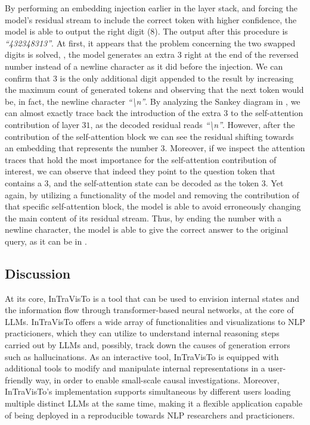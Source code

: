 By performing an embedding injection earlier in the layer stack, and forcing the model's residual stream to include the correct token with higher confidence, the model is  able to output the right digit ($8$).
The output after this procedure is \emph{``432348313''}.
At first, it appears that the problem concerning the two swapped digits is solved, , the model generates an extra $3$ right at the end of the reversed number instead of a newline character as it did before the injection.
We can confirm that $3$ is the only additional digit appended to the result by increasing the maximum count of generated tokens and observing that the next token would be, in fact, the newline character \emph{``\textbackslash{}n''}.
By analyzing the Sankey diagram in , we can almost exactly trace back the introduction of the extra $3$ to the self-attention contribution of layer $31$, as  the decoded residual reads \emph{``\textbackslash{}n''}.
However, after the contribution of the  self-attention block we can see the residual shifting towards an embedding that represents the number $3$.
Moreover, if we inspect the attention traces that hold the most importance for the self-attention contribution of interest, we can observe that indeed they point to the question token that contains a $3$, and the self-attention state  can be decoded as the token $3$.
Yet again, by utilizing a functionality of the model and removing the contribution of that specific self-attention block, the model is able to avoid erroneously changing the main content of its residual stream.
Thus, by ending the number with a newline character, the model is able to give the correct answer to the original query, as it can be  in .


\subsection{Discussion}

At its core, InTraVisTo is a tool that can be used to envision internal states and the information flow through transformer-based neural networks, at the core of LLMs.
InTraVisTo offers a wide array of functionalities and visualizations to NLP practicioners, which they can utilize to understand internal reasoning steps carried out by LLMs and, possibly, track down the causes of generation errors such as hallucinations.
As an interactive tool, InTraVisTo is equipped with additional tools to modify and manipulate internal representations in a user-friendly way, in order to enable small-scale causal investigations.
Moreover, InTraVisTo's implementation supports simultaneous  by different users loading multiple distinct LLMs at the same time, making it a flexible application capable of being deployed in a reproducible   towards NLP researchers and practicioners.

